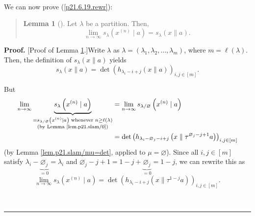 \documentclass[numbers=enddot,12pt,final,onecolumn,notitlepage]{scrartcl}%
\newenvironment{statement}{\begin{quote}}{\end{quote}}
\theoremstyle{definition}
\newtheorem{lem}[theo]{Lemma}
\newenvironment{lemmain}[1][]
{\begin{statement}\begin{lem}[#1]}
{\end{lem}\end{statement}}
\newenvironment{proof}[1][Proof]{\noindent\textbf{#1.} }{\ \rule{0.5em}{0.5em}}
\newenvironment{lemmain}[1][Proof]{\noindent\textbf{#1.} }{\ \rule{0.5em}{0.5em}}
\begin{document}
\begin{enumerate}
We can now prove (\ref{p21.6.19.rewr}):

\begin{lemmain}
\label{lem.p21.6.19}Let $\lambda$ be a partition. Then,%
\[
\lim\limits_{n\rightarrow\infty}s_{\lambda}\left(  x^{\left(  n\right)  }\mid
a\right)  =s_{\lambda}\left(  x\parallel a\right)  .
\]

\end{lemmain}

\begin{proof}
[Proof of Lemma \ref{lem.p21.6.19}.]Write $\lambda$ as $\lambda=\left(
\lambda_{1},\lambda_{2},\ldots,\lambda_{m}\right)  $, where $m=\ell\left(
\lambda\right)  $. Then, the definition of $s_{\lambda}\left(  x\parallel
a\right)  $ yields%
\begin{equation}
s_{\lambda}\left(  x\parallel a\right)  =\det\left(  h_{\lambda_{i}%
-i+j}\left(  x\parallel a\right)  \right)  _{i,j\in\left[  m\right]  }.
\label{pf.lem.p21.6.19.0}%
\end{equation}


But%
\begin{align*}
\lim\limits_{n\rightarrow\infty}\underbrace{s_{\lambda}\left(  x^{\left(
n\right)  }\mid a\right)  }_{\substack{=s_{\lambda/\varnothing}\left(
x^{\left(  n\right)  }\mid a\right)  \text{ whenever }n\geq\ell\left(
\lambda\right)  \\\text{(by Lemma \ref{lem.p21.slam/0})}}}  &  =\lim
\limits_{n\rightarrow\infty}s_{\lambda/\varnothing}\left(  x^{\left(
n\right)  }\mid a\right) \\
&  =\det\left(  h_{\lambda_{i}-\varnothing_{j}-i+j}\left(  x\parallel
\tau^{\varnothing_{j}-j+1}a\right)  \right)  _{i,j\in\left[  m\right]  }%
\end{align*}
(by Lemma \ref{lem.p21.slam/mu=det}, applied to $\mu=\varnothing$). Since all
$i,j\in\left[  m\right]  $ satisfy $\lambda_{i}-\underbrace{\varnothing_{j}%
}_{=0}=\lambda_{i}$ and $\varnothing_{j}-j+1=1-j+\underbrace{\varnothing_{j}%
}_{=0}=1-j$, we can rewrite this as%
\begin{equation}
\lim\limits_{n\rightarrow\infty}s_{\lambda}\left(  x^{\left(  n\right)  }\mid
a\right)  =\det\left(  h_{\lambda_{i}-i+j}\left(  x\parallel\tau
^{1-j}a\right)  \right)  _{i,j\in\left[  m\right]  }.
\label{pf.lem.p21.6.19.5}%
\end{equation}



\end{proof}
\end{enumerate}
\end{document}
